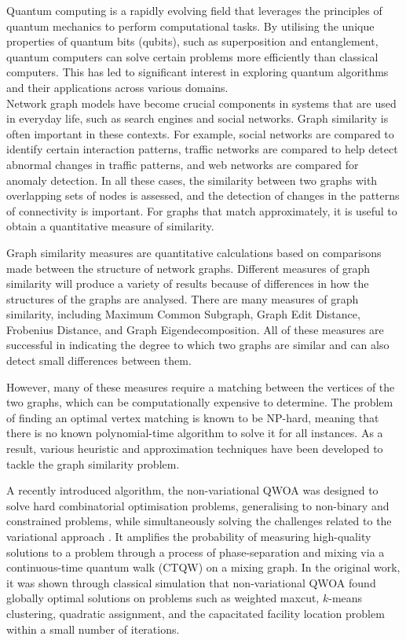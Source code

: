 Quantum computing is a rapidly evolving field that leverages the principles of quantum mechanics to perform computational tasks. By utilising the unique properties of quantum bits (qubits), such as superposition and entanglement, quantum computers can solve certain problems more efficiently than classical computers. This has led to significant interest in exploring quantum algorithms and their applications across various domains.
\\
Network graph models have become crucial components in systems that are used in everyday life, such as search engines and social networks. Graph similarity is often important in these contexts. For example, social networks are compared to identify certain interaction patterns, traffic networks are compared to help detect abnormal changes in traffic patterns, and web networks are compared for anomaly detection. In all these cases, the similarity between two graphs with overlapping sets of nodes is assessed, and the detection of changes in the patterns of connectivity is important. For graphs that match approximately, it is useful to obtain a quantitative measure of similarity.

Graph similarity measures are quantitative calculations based on comparisons made between the structure of network graphs. Different measures of graph similarity will produce a variety of results because of differences in how the structures of the graphs are analysed. There are many measures of graph similarity, including Maximum Common Subgraph, Graph Edit Distance, Frobenius Distance, and Graph Eigendecomposition. All of these measures are successful in indicating the degree to which two graphs are similar and can also detect small differences between them.

However, many of these measures require a matching between the vertices of the two graphs, which can be computationally expensive to determine. The problem of finding an optimal vertex matching is known to be NP-hard, meaning that there is no known polynomial-time algorithm to solve it for all instances. As a result, various heuristic and approximation techniques have been developed to tackle the graph similarity problem.

A recently introduced algorithm, the non-variational QWOA was designed to solve hard combinatorial optimisation problems, generalising to non-binary and constrained problems, while simultaneously solving the challenges related to the variational approach \cite{bennett2024nonvariational}. It amplifies the probability of measuring high-quality solutions to a problem through a process of phase-separation and mixing via a continuous-time quantum walk (CTQW) on a mixing graph. In the original work, it was shown through classical simulation that non-variational QWOA found globally optimal solutions on problems such as weighted maxcut, $k$-means clustering, quadratic assignment, and the capacitated facility location problem within a small number of iterations.

